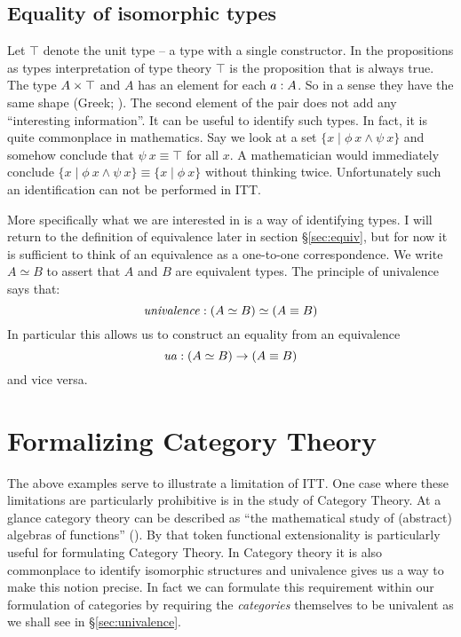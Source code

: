 \subsection{Equality of isomorphic types}
%
Let $\top$ denote the unit type -- a type with a single constructor.
In the propositions as types interpretation of type theory $\top$ is
the proposition that is always true. The type $A \times \top$ and $A$ has
an element for each $a \mathrel{:} A$. So in a sense they have the same shape
(Greek;
). The second element of the pair does not
add any ``interesting information''. It can be useful to identify such
types. In fact, it is quite commonplace in mathematics. Say we look at
a set $\{x \mid \phi\ x \land \psi\ x\}$ and somehow conclude that
$\psi\ x \equiv \top$ for all $x$. A mathematician would immediately
conclude $\{x \mid \phi\ x \land \psi\ x\} \equiv \{x \mid \phi\ x\}$
without thinking twice. Unfortunately such an identification can not
be performed in ITT.

More specifically what we are interested in is a way of identifying
 types. I will return to the definition of
equivalence later in section \S\ref{sec:equiv}, but for now it is
sufficient to think of an equivalence as a one-to-one correspondence.
We write $A \simeq B$ to assert that $A$ and $B$ are equivalent types.
The principle of univalence says that:
%
$$\mathit{univalence} \mathrel{:} (A \simeq B) \simeq (A \equiv B)$$
%
In particular this allows us to construct an equality from an equivalence
%
$$\mathit{ua} \mathrel{:} (A \simeq B) \to (A \equiv B)$$
%
and vice versa.

\section{Formalizing Category Theory}
%
The above examples serve to illustrate a limitation of ITT. One case
where these limitations are particularly prohibitive is in the study
of Category Theory. At a glance category theory can be described as
``the mathematical study of (abstract) algebras of functions''
(\cite{awodey-2006}). By that token functional extensionality is
particularly useful for formulating Category Theory. In Category
theory it is also commonplace to identify isomorphic structures and
univalence gives us a way to make this notion precise. In fact we can
formulate this requirement within our formulation of categories by
requiring the \emph{categories} themselves to be univalent as we shall
see in \S\ref{sec:univalence}.

